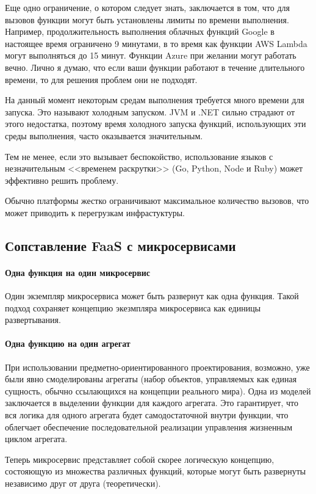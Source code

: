 \documentclass[%
	11pt,
	a4paper,
	utf8,
		]{article}
\begin{document}
Еще одно ограничение, о котором следует знать, заключается в том, что для вызовов функции могут быть установлены лимиты по времени выполнения. Например, продолжительность выполнения облачных функций Google в настоящее время ограничено 9 минутами, в то время как функции AWS Lambda могут выполняться до 15 минут. Функции Azure при желании могут работать вечно. Лично я думаю, что если ваши функции работают в течение длительного времени, то для решения проблем они не подходят.

На данный момент некоторым средам выполнения требуется много времени для запуска. Это называют холодным запуском. JVM и .NET сильно страдают от этого недостатка, поэтому время холодного запуска функций, использующих эти среды выполнения, часто оказывается значительным.

Тем не менее, если это вызывает беспокойство, использование языков с незначительным <<временем раскрутки>> (Go, Python, Node и Ruby) может эффективно решить проблему.

Обычно платформы жестко ограничивают максимальное количество вызовов, что может приводить к перегрузкам инфрастуктуры.

\subsection{Сопставление FaaS с микросервисами}

\paragraph{Одна функция на один микросервис} Один экземпляр микросервиса может быть развернут как одна функция. Такой подход сохраняет концепцию экезмпляра микросервиса как единицы развертывания. 

\paragraph{Одна функцию на один агрегат} При использовании предметно-ориентированного проектирования, возможно, уже были явно смоделированы агрегаты (набор объектов, управляемых как единая сущность, обычно ссылающихся на концепции реального мира). Одна из моделей заключается в выделении функции для каждого агрегата. Это гарантирует, что вся логика для одного агрегата будет самодостаточной внутри функции, что облегчает обеспечение последовательной реализации управления жизненным циклом агрегата.

Теперь микросервис представляет собой скорее логическую концепцию, состояющую из множества различных функций, которые могут быть развернуты независимо друг от друга (теоретически).
\end{document}

